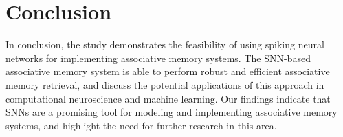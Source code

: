 \chapter{Conclusion}%

In conclusion, the study demonstrates the feasibility of using spiking neural
networks for implementing associative memory systems. The SNN-based associative
memory system is able to perform robust and efficient associative memory
retrieval, and discuss the potential applications of this approach in
computational neuroscience and machine learning. Our findings indicate that
SNNs are a promising tool for modeling and implementing associative memory
systems, and highlight the need for further research in this area.\par

